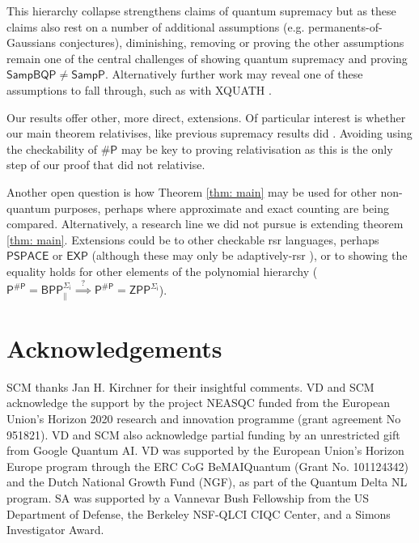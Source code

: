 \documentclass{article}
\begin{document}
This hierarchy collapse strengthens claims of quantum supremacy but as these claims also rest on a number of additional assumptions (e.g. permanents-of-Gaussians conjectures), diminishing, removing or proving the other assumptions remain one of the central challenges of showing quantum supremacy and proving $\mathsf{SampBQP\neq SampP}$. Alternatively further work may reveal one of these assumptions to fall through, such as with XQUATH \cite{aharonov2023polynomial}.

Our results offer other, more direct, extensions. Of particular interest is whether our main theorem relativises, like previous supremacy results did \cite{aaronson2011computational}. Avoiding using the checkability of $\mathsf{\#P}$ may be key to proving relativisation as this is the only step of our proof that did not relativise.

Another open question is how Theorem \ref{thm: main} may be used for other non-quantum purposes, perhaps where approximate and exact counting are being compared.
Alternatively, a research line we did not pursue is extending theorem \ref{thm: main}. Extensions could be to other checkable rsr languages, perhaps $\mathsf{PSPACE}$ or $\mathsf{EXP}$ (although these may only be adaptively-rsr \cite{feigenbaum1990random}), or to showing the equality holds for other elements of the polynomial hierarchy ($\mathsf{P^{\# P}=BPP^{\Sigma_i}_{\parallel}\stackrel{?}{\implies} P^{\# P}=ZPP^{\Sigma_i}} $).

\section*{Acknowledgements}
SCM thanks Jan H. Kirchner for their insightful comments.
VD and SCM acknowledge the support by the project NEASQC funded from the European Union’s Horizon 2020 research and innovation programme (grant agreement No 951821). VD and SCM also acknowledge partial funding by an unrestricted gift from Google Quantum AI.
VD was supported by the European Union’s Horizon Europe program through the ERC CoG BeMAIQuantum (Grant No. 101124342) and the Dutch National Growth Fund (NGF), as part of the Quantum Delta NL program.
SA was supported by a Vannevar Bush Fellowship from the US Department of Defense, the Berkeley NSF-QLCI CIQC Center, and a Simons Investigator Award.


\end{document}
